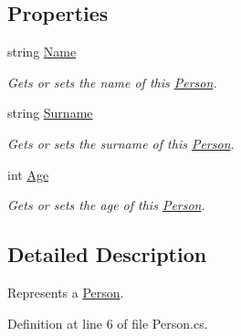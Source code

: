 \subsection*{Properties}
\begin{DoxyCompactItemize}
\item 
string \mbox{\hyperlink{struct_test_project_1_1_task_library_1_1_tasks_1_1_lesson2_1_1_models_1_1_person_a278b35880a61b47b0ca047f61f09dfbd}{Name}}
\begin{DoxyCompactList}\small\item\em Gets or sets the name of this \mbox{\hyperlink{struct_test_project_1_1_task_library_1_1_tasks_1_1_lesson2_1_1_models_1_1_person}{Person}}. \end{DoxyCompactList}\item 
string \mbox{\hyperlink{struct_test_project_1_1_task_library_1_1_tasks_1_1_lesson2_1_1_models_1_1_person_a753f2350fedcb5cd27462518caf030a7}{Surname}}
\begin{DoxyCompactList}\small\item\em Gets or sets the surname of this \mbox{\hyperlink{struct_test_project_1_1_task_library_1_1_tasks_1_1_lesson2_1_1_models_1_1_person}{Person}}. \end{DoxyCompactList}\item 
int \mbox{\hyperlink{struct_test_project_1_1_task_library_1_1_tasks_1_1_lesson2_1_1_models_1_1_person_a6ae5d9153128806b00d67afd00a49dec}{Age}}
\begin{DoxyCompactList}\small\item\em Gets or sets the age of this \mbox{\hyperlink{struct_test_project_1_1_task_library_1_1_tasks_1_1_lesson2_1_1_models_1_1_person}{Person}}. \end{DoxyCompactList}\end{DoxyCompactItemize}


\subsection{Detailed Description}
Represents a \mbox{\hyperlink{struct_test_project_1_1_task_library_1_1_tasks_1_1_lesson2_1_1_models_1_1_person}{Person}}. 



Definition at line 6 of file Person.\+cs.



